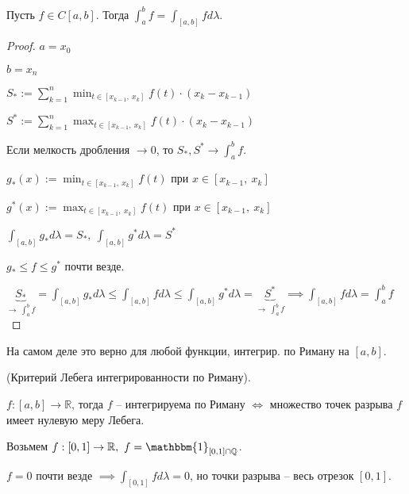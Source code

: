\begin{theorem}
    Пусть $f \in C[a, b]$. Тогда $\int_a^b {f} = \int_{[a, b]}{f d \lambda}$.
\end{theorem}
\begin{proof}
    $a = x_0$

    $b = x_n$

    $S_* := \sum_{k=1}^{n} \min_{t \in [x_{k-1}, \ x_k]} {f(t) \cdot (x_k - x_{k-1})}$

    $S^* := \sum_{k=1}^{n} \max_{t \in [x_{k-1}, \ x_k]} {f(t) \cdot (x_k - x_{k-1})}$


    Если мелкость дробления $\rightarrow 0$, то $S_*, S^* \rightarrow \int_a^b {f}$.

    $g_*(x) := \min_{t \in [x_{k - 1}, \ x_k]}{f(t)}$ при $x \in [x_{k - 1}, \ x_k]$

    $g^*(x) := \max_{t \in [x_{k - 1}, \ x_k]}{f(t)}$ при $x \in [x_{k - 1}, \ x_k]$

    $\int_{[a, b]}{g_* d \lambda} = S_*, \ \int_{[a, b]}{g^* d \lambda} = S^*$

    $g_* \leq f \leq g^*$ почти везде.

    $\underbrace{S_*}_{\rightarrow \ \int_a^b f} = \int_{[a, b]}{g_* d \lambda} \leq \int_{[a, b]}{f d \lambda} \leq \int_{[a, b]}{g^* d \lambda} = \underbrace{S^*}_{\rightarrow \ \int_a^b{f}} \implies \int_{[a, b]}{f d \lambda} = \int_a^b {f}$
\end{proof}
\begin{remark}
    На самом деле это верно для любой функции, интегрир. по Риману на $[a, b]$.
\end{remark}

\begin{theorem}
    (Критерий Лебега интегрированности по Риману).

    $f: [a, b] \rightarrow \mathbb{R}$, тогда $f$ -- интегрируема по Риману $\Leftrightarrow$ множество точек разрыва $f$ имеет нулевую меру Лебега.
\end{theorem}
\begin{example}
    Возьмем $f: [0, 1] \rightarrow \mathbb{R}, \ f = \mathbbm{1}_{[0, 1] \cap \mathbb{Q}}$.

    $f = 0$ почти везде $\implies \int_{[0, 1]}{f d \lambda} = 0$, но точки разрыва -- весь отрезок $[0, 1]$.
\end{example}

